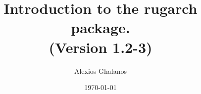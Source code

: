 \documentclass[11pt,a4paper]{article}
\begin{document}
\title{Introduction to the rugarch package.\\
(Version 1.2-3)}
\author{Alexios Ghalanos}
\date{\today}
\maketitle
\tableofcontents
\newpage

\clearpage

\end{document}
